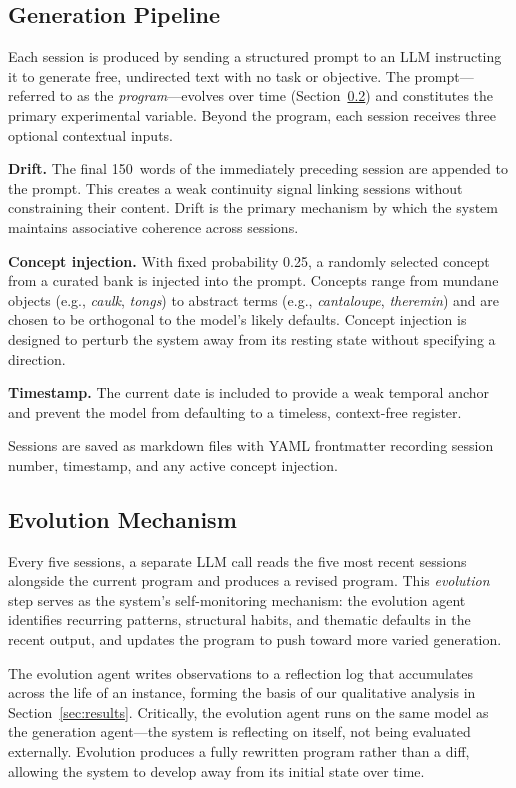 \documentclass{article}
\begin{document}
\subsection{Generation Pipeline}

Each session is produced by sending a structured prompt to an LLM instructing
it to generate free, undirected text with no task or objective. The prompt---
referred to as the \emph{program}---evolves over time (Section~\ref{sec:evolution})
and constitutes the primary experimental variable. Beyond the program, each
session receives three optional contextual inputs.

\textbf{Drift.} The final 150~words of the immediately preceding session are
appended to the prompt. This creates a weak continuity signal linking sessions
without constraining their content. Drift is the primary mechanism by which
the system maintains associative coherence across sessions.

\textbf{Concept injection.} With fixed probability 0.25,
a randomly selected concept from a curated bank is injected into the prompt.
Concepts range from mundane objects (e.g., \emph{caulk}, \emph{tongs}) to
abstract terms (e.g., \emph{cantaloupe}, \emph{theremin}) and are chosen to be
orthogonal to the model's likely defaults. Concept injection is designed to
perturb the system away from its resting state without specifying a direction.

\textbf{Timestamp.} The current date is included to provide a weak temporal
anchor and prevent the model from defaulting to a timeless, context-free
register.

Sessions are saved as markdown files with YAML frontmatter recording session
number, timestamp, and any active concept injection.

\subsection{Evolution Mechanism}
\label{sec:evolution}

Every five sessions, a separate LLM call reads the five most recent sessions
alongside the current program and produces a revised program. This
\emph{evolution} step serves as the system's self-monitoring mechanism: the
evolution agent identifies recurring patterns, structural habits, and thematic
defaults in the recent output, and updates the program to push toward more
varied generation.

The evolution agent writes observations to a reflection log that accumulates
across the life of an instance, forming the basis of our qualitative analysis
in Section~\ref{sec:results}. Critically, the evolution agent runs on the same
model as the generation agent---the system is reflecting on itself, not being
evaluated externally. Evolution produces a fully rewritten program rather than
a diff, allowing the system to develop away from its initial state over time.
\end{document}
